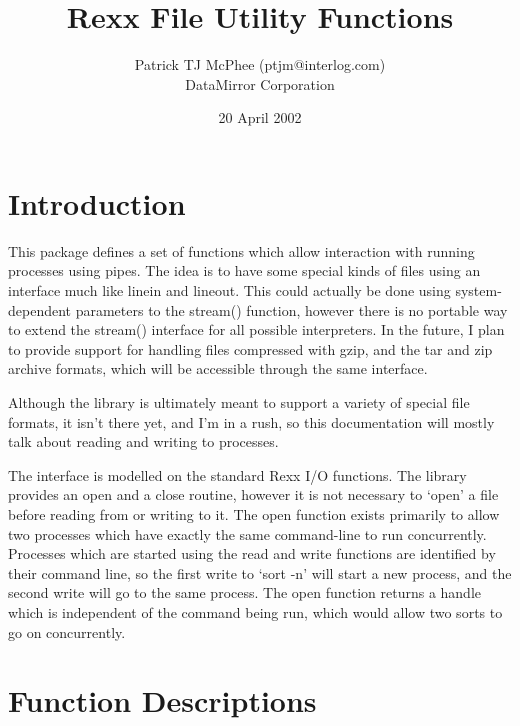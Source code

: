 \documentclass{article}
\begin{document}
\let\thepage\relax

\title{Rexx File Utility Functions}
\author{Patrick TJ McPhee (ptjm@interlog.com)\\
        DataMirror Corporation}
\date{20 April 2002}

\maketitle

\eject
\setcounter{page}{1}

\tableofcontents

\vfil\eject
\setcounter{page}{1}

\section{Introduction}

This package defines a set of functions which allow interaction with
running processes using pipes.
The idea is to have some special kinds of files using an interface much
like linein and lineout. This could actually be done using system-dependent
parameters to the stream() function, however there is no portable way
to extend the stream() interface for all possible interpreters.
In the future, I plan to provide support for handling files compressed
with gzip, and the tar and zip archive formats, which will be accessible
through the same interface.

Although the library is ultimately meant to support a variety of special
file formats, it isn't there yet, and I'm in a rush, so this
documentation will mostly talk about reading and writing to processes.

The interface is modelled on the standard Rexx I/O functions. The library
provides an open and a close routine, however it is not necessary to
`open' a file before reading from or writing to it.
The open function exists primarily to allow two processes which have
exactly the same command-line to run concurrently. Processes which are
started using the read and write functions are identified by their
command line, so the first write to `sort -n' will start a new process,
and the second write will go to the same process. The open function
returns a handle which is independent of the command being run, which
would allow two sorts to go on concurrently.

\section{Function Descriptions}
\end{document}

